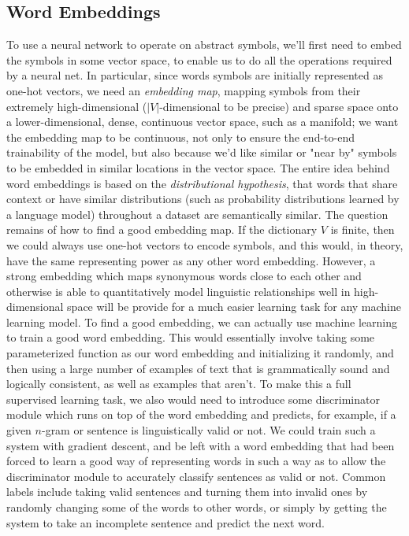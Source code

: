 \documentclass{article}
\begin{document}
\subsection{Word Embeddings}
To use a neural network to operate on abstract symbols, we'll first need to embed the symbols in some vector space, to enable us to do all the operations required by a neural net. In particular, since words symbols are initially represented as one-hot vectors, we need an \textit{embedding map}, mapping symbols from their extremely high-dimensional ($ | V | $-dimensional to be precise) and sparse space onto a lower-dimensional, dense, continuous vector space, such as a manifold; we want the embedding map to be continuous, not only to ensure the end-to-end trainability of the model, but also because we'd like similar or "near by" symbols to be embedded in similar locations in the vector space. The entire idea behind word embeddings is based on the \textit{distributional hypothesis}, that words that share context or have similar distributions (such as probability distributions learned by a language model) throughout a dataset are semantically similar.
\newline \newline
The question remains of how to find a good embedding map. If the dictionary $ V $ is finite, then we could always use one-hot vectors to encode symbols, and this would, in theory, have the same representing power as any other word embedding. However, a strong embedding which maps synonymous words close to each other and otherwise is able to quantitatively model linguistic relationships well in high-dimensional space will be provide for a much easier learning task for any machine learning model. To find a good embedding, we can actually use machine learning to train a good word embedding. This would essentially involve taking some parameterized function as our word embedding and initializing it randomly, and then using a large number of examples of text that is grammatically sound and logically consistent, as well as examples that aren't. To make this a full supervised learning task, we also would need to introduce some discriminator module which runs on top of the word embedding and predicts, for example, if a given $ n $-gram or sentence is linguistically valid or not. We could train such a system with gradient descent, and be left with a word embedding that had been forced to learn a good way of representing words in such a way as to allow the discriminator module to accurately classify sentences as valid or not. Common labels include taking valid sentences and turning them into invalid ones by randomly changing some of the words to other words, or simply by getting the system to take an incomplete sentence and predict the next word.
\end{document}
